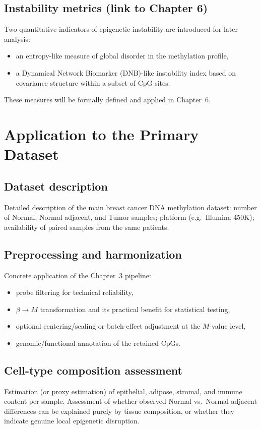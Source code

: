 \documentclass[10pt]{extarticle}
\begin{document}
\subsection{Instability metrics (link to Chapter 6)}
Two quantitative indicators of epigenetic instability are introduced for later analysis:
\begin{itemize}[label=-]
    \item an entropy-like measure of global disorder in the methylation profile,
    \item a Dynamical Network Biomarker (DNB)-like instability index based on covariance structure within a subset of CpG sites.
\end{itemize}
These measures will be formally defined and applied in Chapter~6.


\section{Application to the Primary Dataset}

\subsection{Dataset description}
Detailed description of the main breast cancer DNA methylation dataset: number of Normal, Normal-adjacent, and Tumor samples; platform (e.g.\ Illumina 450K); availability of paired samples from the same patients.

\subsection{Preprocessing and harmonization}
Concrete application of the Chapter~3 pipeline:
\begin{itemize}[label=-]
    \item probe filtering for technical reliability,
    \item $\beta \rightarrow M$ transformation and its practical benefit for statistical testing,
    \item optional centering/scaling or batch-effect adjustment at the $M$-value level,
    \item genomic/functional annotation of the retained CpGs.
\end{itemize}

\subsection{Cell-type composition assessment}
Estimation (or proxy estimation) of epithelial, adipose, stromal, and immune content per sample.  
Assessment of whether observed Normal vs.\ Normal-adjacent differences can be explained purely by tissue composition, or whether they indicate genuine local epigenetic disruption.
\end{document}
